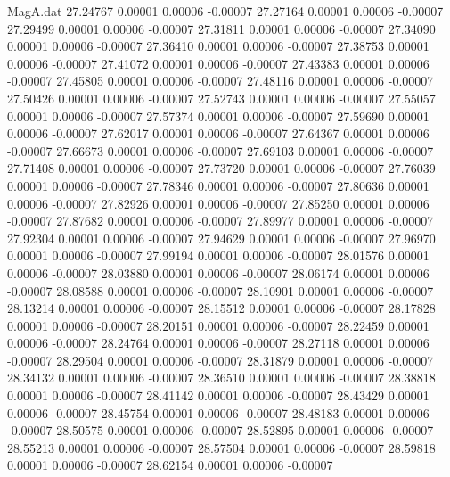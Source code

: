 \begin{filecontents}{MagA.dat}
  27.24767    0.00001    0.00006   -0.00007
  27.27164    0.00001    0.00006   -0.00007
  27.29499    0.00001    0.00006   -0.00007
  27.31811    0.00001    0.00006   -0.00007
  27.34090    0.00001    0.00006   -0.00007
  27.36410    0.00001    0.00006   -0.00007
  27.38753    0.00001    0.00006   -0.00007
  27.41072    0.00001    0.00006   -0.00007
  27.43383    0.00001    0.00006   -0.00007
  27.45805    0.00001    0.00006   -0.00007
  27.48116    0.00001    0.00006   -0.00007
  27.50426    0.00001    0.00006   -0.00007
  27.52743    0.00001    0.00006   -0.00007
  27.55057    0.00001    0.00006   -0.00007
  27.57374    0.00001    0.00006   -0.00007
  27.59690    0.00001    0.00006   -0.00007
  27.62017    0.00001    0.00006   -0.00007
  27.64367    0.00001    0.00006   -0.00007
  27.66673    0.00001    0.00006   -0.00007
  27.69103    0.00001    0.00006   -0.00007
  27.71408    0.00001    0.00006   -0.00007
  27.73720    0.00001    0.00006   -0.00007
  27.76039    0.00001    0.00006   -0.00007
  27.78346    0.00001    0.00006   -0.00007
  27.80636    0.00001    0.00006   -0.00007
  27.82926    0.00001    0.00006   -0.00007
  27.85250    0.00001    0.00006   -0.00007
  27.87682    0.00001    0.00006   -0.00007
  27.89977    0.00001    0.00006   -0.00007
  27.92304    0.00001    0.00006   -0.00007
  27.94629    0.00001    0.00006   -0.00007
  27.96970    0.00001    0.00006   -0.00007
  27.99194    0.00001    0.00006   -0.00007
  28.01576    0.00001    0.00006   -0.00007
  28.03880    0.00001    0.00006   -0.00007
  28.06174    0.00001    0.00006   -0.00007
  28.08588    0.00001    0.00006   -0.00007
  28.10901    0.00001    0.00006   -0.00007
  28.13214    0.00001    0.00006   -0.00007
  28.15512    0.00001    0.00006   -0.00007
  28.17828    0.00001    0.00006   -0.00007
  28.20151    0.00001    0.00006   -0.00007
  28.22459    0.00001    0.00006   -0.00007
  28.24764    0.00001    0.00006   -0.00007
  28.27118    0.00001    0.00006   -0.00007
  28.29504    0.00001    0.00006   -0.00007
  28.31879    0.00001    0.00006   -0.00007
  28.34132    0.00001    0.00006   -0.00007
  28.36510    0.00001    0.00006   -0.00007
  28.38818    0.00001    0.00006   -0.00007
  28.41142    0.00001    0.00006   -0.00007
  28.43429    0.00001    0.00006   -0.00007
  28.45754    0.00001    0.00006   -0.00007
  28.48183    0.00001    0.00006   -0.00007
  28.50575    0.00001    0.00006   -0.00007
  28.52895    0.00001    0.00006   -0.00007
  28.55213    0.00001    0.00006   -0.00007
  28.57504    0.00001    0.00006   -0.00007
  28.59818    0.00001    0.00006   -0.00007
  28.62154    0.00001    0.00006   -0.00007

\end{filecontents}
